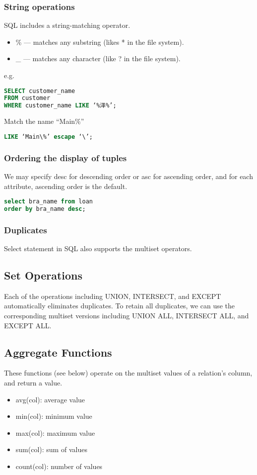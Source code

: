 \subsubsection{String operations}
SQL includes a string-matching operator. 
\begin{itemize}
    \item \% --- matches any substring (likes * in the file system).
    \item \_ --- matches any character (like ? in the file system).
\end{itemize}
e.g. 
\begin{lstlisting}[language=sql]
SELECT customer_name
FROM customer
WHERE customer_name LIKE ‘%泽%’;
\end{lstlisting}
Match the name “Main\%”
\begin{lstlisting}[language=sql]
LIKE ‘Main\%’ escape ‘\’; 
\end{lstlisting}



\subsubsection{Ordering the display of tuples}
We may specify desc for descending order or asc for ascending order, and for each attribute, ascending order is the default.
\begin{lstlisting}[language=sql]
select bra_name from loan
order by bra_name desc;
\end{lstlisting}


\subsubsection{Duplicates}
Select statement in SQL also supports the multiset operators.

\subsection{Set Operations}
Each of the operations including UNION, INTERSECT, and EXCEPT automatically eliminates duplicates. To retain all duplicates, we can use the corresponding multiset versions including UNION ALL, INTERSECT ALL, and EXCEPT ALL.

\subsection{Aggregate Functions}
These functions (see below) operate on the multiset values of a relation’s column, and return a value.
\begin{itemize}
    \item avg(col): average value
    \item min(col): minimum value
    \item max(col): maximum value
    \item sum(col): sum of values
    \item count(col): number of values
\end{itemize}

